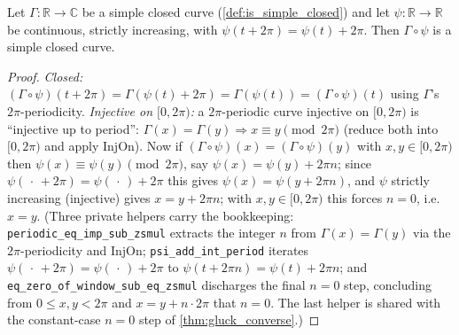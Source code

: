 \begin{lemma}
  \label{lem:is_simple_closed_comp}
  Let $\Gamma:\mathbb{R}\to\mathbb{C}$ be a simple closed curve
  (\cref{def:is_simple_closed}) and let $\psi:\mathbb{R}\to\mathbb{R}$ be
  continuous, strictly increasing, with $\psi(t+2\pi)=\psi(t)+2\pi$. Then
  $\Gamma\circ\psi$ is a simple closed curve.
\end{lemma}
\begin{proof}
  \emph{Closed:} $(\Gamma\circ\psi)(t+2\pi)=\Gamma(\psi(t)+2\pi)=\Gamma(\psi(t))=
  (\Gamma\circ\psi)(t)$ using $\Gamma$'s $2\pi$-periodicity.
  \emph{Injective on $[0,2\pi)$:} a $2\pi$-periodic curve injective on $[0,2\pi)$ is
  ``injective up to period'': $\Gamma(x)=\Gamma(y)\Rightarrow x\equiv y \pmod{2\pi}$
  (reduce both into $[0,2\pi)$ and apply $\mathrm{InjOn}$). Now if
  $(\Gamma\circ\psi)(x)=(\Gamma\circ\psi)(y)$ with $x,y\in[0,2\pi)$ then
  $\psi(x)\equiv\psi(y)\pmod{2\pi}$, say $\psi(x)=\psi(y)+2\pi n$; since
  $\psi(\,\cdot\,+2\pi)=\psi(\,\cdot\,)+2\pi$ this gives $\psi(x)=\psi(y+2\pi n)$, and
  $\psi$ strictly increasing (injective) gives $x=y+2\pi n$; with $x,y\in[0,2\pi)$
  this forces $n=0$, i.e. $x=y$.
  (Three private helpers carry the bookkeeping: \texttt{periodic\_eq\_imp\_sub\_zsmul}
  extracts the integer $n$ from $\Gamma(x)=\Gamma(y)$ via the $2\pi$-periodicity and
  $\mathrm{InjOn}$; \texttt{psi\_add\_int\_period} iterates
  $\psi(\,\cdot\,+2\pi)=\psi(\,\cdot\,)+2\pi$ to $\psi(t+2\pi n)=\psi(t)+2\pi n$; and
  \texttt{eq\_zero\_of\_window\_sub\_eq\_zsmul} discharges the final
  $n=0$ step, concluding from $0\le x,y<2\pi$ and $x=y+n\cdot 2\pi$ that $n=0$. The
  last helper is shared with the constant-case $n=0$ step of \cref{thm:gluck_converse}.)
\end{proof}

